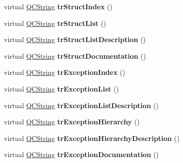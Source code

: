 \begin{DoxyCompactItemize}
virtual \mbox{\hyperlink{class_q_c_string}{Q\+C\+String}} {\bfseries tr\+Struct\+Index} ()
\item 
\mbox{\label{class_translator_dutch_a7537d8c3d4f72e90e09f278ee80d2b8c}} 
virtual \mbox{\hyperlink{class_q_c_string}{Q\+C\+String}} {\bfseries tr\+Struct\+List} ()
\item 
\mbox{\label{class_translator_dutch_ab474323e08b659a18d9a021df772ee6d}} 
virtual \mbox{\hyperlink{class_q_c_string}{Q\+C\+String}} {\bfseries tr\+Struct\+List\+Description} ()
\item 
\mbox{\label{class_translator_dutch_a537352f80e508b7238c1683fc0281b0c}} 
virtual \mbox{\hyperlink{class_q_c_string}{Q\+C\+String}} {\bfseries tr\+Struct\+Documentation} ()
\item 
\mbox{\label{class_translator_dutch_a2f4546ce9ff65bfe06f59f6ed3fa36a9}} 
virtual \mbox{\hyperlink{class_q_c_string}{Q\+C\+String}} {\bfseries tr\+Exception\+Index} ()
\item 
\mbox{\label{class_translator_dutch_a6a603a5bb6f9447dfff342ee92ba7fd2}} 
virtual \mbox{\hyperlink{class_q_c_string}{Q\+C\+String}} {\bfseries tr\+Exception\+List} ()
\item 
\mbox{\label{class_translator_dutch_ac3045024c06ab6d1b30c9501091adff3}} 
virtual \mbox{\hyperlink{class_q_c_string}{Q\+C\+String}} {\bfseries tr\+Exception\+List\+Description} ()
\item 
\mbox{\label{class_translator_dutch_ab993daf7a60dd4411f9e1388896f9805}} 
virtual \mbox{\hyperlink{class_q_c_string}{Q\+C\+String}} {\bfseries tr\+Exception\+Hierarchy} ()
\item 
\mbox{\label{class_translator_dutch_a6d46de54c2484599c9d22e9b8d2080e6}} 
virtual \mbox{\hyperlink{class_q_c_string}{Q\+C\+String}} {\bfseries tr\+Exception\+Hierarchy\+Description} ()
\item 
\mbox{\label{class_translator_dutch_ad56cf45ee666e66e134edb3075e1bfa6}} 
virtual \mbox{\hyperlink{class_q_c_string}{Q\+C\+String}} {\bfseries tr\+Exception\+Documentation} ()

\end{DoxyCompactItemize}
